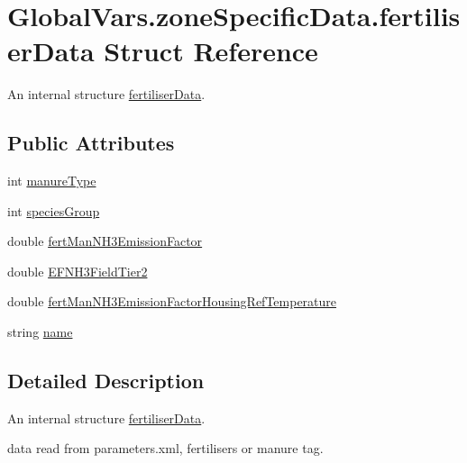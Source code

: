 \hypertarget{struct_global_vars_1_1zone_specific_data_1_1fertiliser_data}{}\section{Global\+Vars.\+zone\+Specific\+Data.\+fertiliser\+Data Struct Reference}
\label{struct_global_vars_1_1zone_specific_data_1_1fertiliser_data}


An internal structure \mbox{\hyperlink{struct_global_vars_1_1zone_specific_data_1_1fertiliser_data}{fertiliser\+Data}}.  


\subsection*{Public Attributes}
\begin{DoxyCompactItemize}
\item 
int \mbox{\hyperlink{struct_global_vars_1_1zone_specific_data_1_1fertiliser_data_a9b270dd3726622d63659bddf55df0790}{manure\+Type}}
\item 
int \mbox{\hyperlink{struct_global_vars_1_1zone_specific_data_1_1fertiliser_data_a3b04b3df1d8eebb5fd45b9c71410c326}{species\+Group}}
\item 
double \mbox{\hyperlink{struct_global_vars_1_1zone_specific_data_1_1fertiliser_data_a3028ac3da076aa37fc654e48778ffb6d}{fert\+Man\+N\+H3\+Emission\+Factor}}
\item 
double \mbox{\hyperlink{struct_global_vars_1_1zone_specific_data_1_1fertiliser_data_a34272d0e84f2ea210d75513b75631e58}{E\+F\+N\+H3\+Field\+Tier2}}
\item 
double \mbox{\hyperlink{struct_global_vars_1_1zone_specific_data_1_1fertiliser_data_ad70c5242e7d425ade1cf7112775d6453}{fert\+Man\+N\+H3\+Emission\+Factor\+Housing\+Ref\+Temperature}}
\item 
string \mbox{\hyperlink{struct_global_vars_1_1zone_specific_data_1_1fertiliser_data_a71523f1fcc994b969accb37aff6397eb}{name}}
\end{DoxyCompactItemize}


\subsection{Detailed Description}
An internal structure \mbox{\hyperlink{struct_global_vars_1_1zone_specific_data_1_1fertiliser_data}{fertiliser\+Data}}. 

data read from parameters.\+xml, fertilisers or manure tag. 

